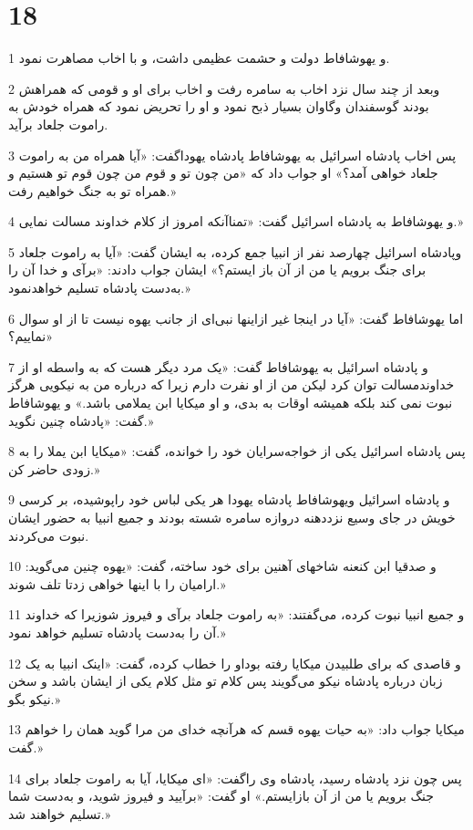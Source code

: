 \chapter{18}

\par 1 و یهوشافاط دولت و حشمت عظیمی داشت، و با اخاب مصاهرت نمود.
\par 2 وبعد از چند سال نزد اخاب به سامره رفت و اخاب برای او و قومی که همراهش بودند گوسفندان وگاوان بسیار ذبح نمود و او را تحریض نمود که همراه خودش به راموت جلعاد برآید.
\par 3 پس اخاب پادشاه اسرائیل به یهوشافاط پادشاه یهوداگفت: «آیا همراه من به راموت جلعاد خواهی آمد؟» او جواب داد که «من چون تو و قوم من چون قوم تو هستیم و همراه تو به جنگ خواهیم رفت.»
\par 4 و یهوشافاط به پادشاه اسرائیل گفت: «تمناآنکه امروز از کلام خداوند مسالت نمایی.»
\par 5 وپادشاه اسرائیل چهارصد نفر از انبیا جمع کرده، به ایشان گفت: «آیا به راموت جلعاد برای جنگ برویم یا من از آن باز ایستم؟» ایشان جواب دادند: «برآی و خدا آن را به‌دست پادشاه تسلیم خواهدنمود.»
\par 6 اما یهوشافاط گفت: «آیا در اینجا غیر ازاینها نبی‌ای از جانب یهوه نیست تا از او سوال نماییم؟»
\par 7 و پادشاه اسرائیل به یهوشافاط گفت: «یک مرد دیگر هست که به واسطه او از خداوندمسالت توان کرد لیکن من از او نفرت دارم زیرا که درباره من به نیکویی هرگز نبوت نمی کند بلکه همیشه اوقات به بدی، و او میکایا ابن یملامی باشد.» و یهوشافاط گفت: «پادشاه چنین نگوید.»
\par 8 پس پادشاه اسرائیل یکی از خواجه‌سرایان خود را خوانده، گفت: «میکایا ابن یملا را به زودی حاضر کن.»
\par 9 و پادشاه اسرائیل ویهوشافاط پادشاه یهودا هر یکی لباس خود راپوشیده، بر کرسی خویش در جای وسیع نزددهنه دروازه سامره شسته بودند و جمیع انبیا به حضور ایشان نبوت می‌کردند.
\par 10 و صدقیا ابن کنعنه شاخهای آهنین برای خود ساخته، گفت: «یهوه چنین می‌گوید: ارامیان را با اینها خواهی زدتا تلف شوند.»
\par 11 و جمیع انبیا نبوت کرده، می‌گفتند: «به راموت جلعاد برآی و فیروز شوزیرا که خداوند آن را به‌دست پادشاه تسلیم خواهد نمود.»
\par 12 و قاصدی که برای طلبیدن میکایا رفته بوداو را خطاب کرده، گفت: «اینک انبیا به یک زبان درباره پادشاه نیکو می‌گویند پس کلام تو مثل کلام یکی از ایشان باشد و سخن نیکو بگو.»
\par 13 میکایا جواب داد: «به حیات یهوه قسم که هر‌آنچه خدای من مرا گوید همان را خواهم گفت.»
\par 14 پس چون نزد پادشاه رسید، پادشاه وی راگفت: «ای میکایا، آیا به راموت جلعاد برای جنگ برویم یا من از آن بازایستم.» او گفت: «برآیید و فیروز شوید، و به‌دست شما تسلیم خواهند شد.»
